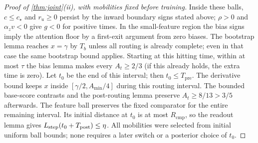 \begin{proof}[Proof of \cref{thm:joint}(ii), with mobilities fixed before training]
Inside these balls, $c\le c_\star$ and $r_u\ge0$ persist by the inward
boundary signs stated above; $\rho>0$ and ${\alpha_z v}<0$ give $g<0$ for positive
times. In the small-feature region the bias signs imply the attention
floor by a first-exit argument from zero biases. The bootstrap lemma
reaches $x=\gamma$ by $T_b$ unless all routing is already complete;
even in that case the same bootstrap bound applies. Starting at this
hitting time, within at most $\tau$ the bias lemma makes every
$A_t\ge2/3$ (if this already holds, the extra time is zero). Let $t_0$
be the end of this interval; then $t_0\le T_{\mathrm{pre}}$.
The derivative bound keeps $x$ inside $[\gamma/2,A_{\min}/4]$ during
this routing interval. The bounded base-score contrasts and the
post-routing lemma preserve $A_t\ge8/13>3/5$ afterwards.
The feature ball preserves the fixed comparator for the entire remaining
interval. Its initial distance at $t_0$ is at most $R_{\mathrm{cmp}}$, so the readout
lemma gives $L_{\mathrm{step}}(t_0+T_{\mathrm{post}})\le\eta$.
All mobilities were selected from initial uniform ball bounds; none
requires a later switch or a posterior choice of $t_0$.
\end{proof}

